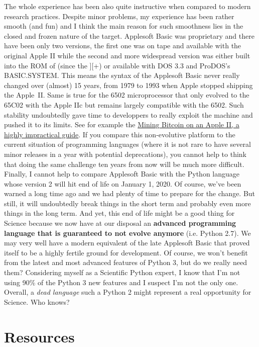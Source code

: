 The whole experience has been also quite instructive when compared to modern
research practices. Despite minor problems, my experience has been rather
smooth (and fun) and I think the main reason for such smoothness lies in the
closed and frozen nature of the target. Applesoft Basic was proprietary and
there have been only two versions, the first one was on tape and available with
the original Apple II while the second and more widespread version was either
built into the ROM of (since the ][+) or available with DOS 3.3 and ProDOS's
BASIC.SYSTEM. This means the syntax of the Applesoft Basic never really changed
over (almost) 15 years, from 1979 to 1993 when Apple stopped shipping the
Apple~II. Same is true for the 6502 microprocessor that only evolved to the
65C02 with the Apple IIc but remains largely compatible with the 6502. Such
stability undoubtedly gave time to developpers to really exploit the machine
and pushed it to its limits. See for example
the \href{https://retroconnector.com/mining-bitcoin-on-an-apple-ii-a-highly-impractical-guide/}{
Mining Bitcoin on an Apple II, a highly impractical guide}. If you compare this
non-evolutive platform to the current situation of programming languages (where
it is not rare to have several minor releases in a year with potential
deprecations), you cannot help to think that doing the same challenge ten years
from now will be much more difficult.\\

Finally, I cannot help to compare Applesoft Basic with the Python language
whose version 2 will hit end of life on January 1, 2020. Of course, we've been
warned a long time ago and we had plenty of time to prepare for the change. But
still, it will undoubtedly break things in the short term and probably even more
things in the long term. And yet, this end of life might be a good thing for
Science because we now have at our disposal an \textbf{advanced programming
language that is guaranteed to not evolve anymore} (i.e. Python 2.7). We may
very well have a modern equivalent of the late Applesoft Basic that proved
itself to be a highly fertile ground for development. Of course, we won't
benefit from the latest and most advanced features of Python 3, but do we
really need them?  Considering myself as a Scientific Python expert, I know
that I'm not using 90\% of the Python 3 new features and I suspect I'm not the
only one. Overall, a {\em dead language} such a Python 2 might represent a real
opportunity for Science. Who knows?


\section*{Resources}

